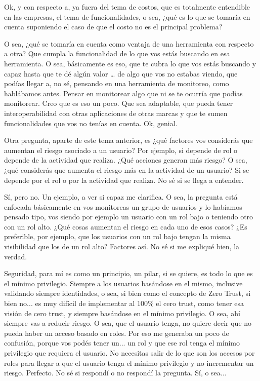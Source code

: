 \begin{description}[leftmargin=0cm, labelsep=0.5cm]
    \item[\textbf{MOCIULSKY SANTIAGO:}] Ok, y con respecto a, ya fuera del tema de costos, que es totalmente entendible en las empresas, el tema de funcionalidades, o sea, ¿qué es lo que se tomaría en cuenta suponiendo el caso de que el costo no es el principal problema?

    \item[\textbf{JACUBOVICH LUCIANA:}] O sea, ¿qué se tomaría en cuenta como ventaja de una herramienta con respecto a otra? Que cumpla la funcionalidad de lo que vos estás buscando en esa herramienta. O sea, básicamente es eso, que te cubra lo que vos estás buscando y capaz hasta que te dé algún valor … de algo que vos no estabas viendo, que podías llegar a, no sé, pensando en una herramienta de monitoreo, como hablábamos antes. Pensar en monitorear algo que ni se te ocurría que podías monitorear. Creo que es eso un poco. Que sea adaptable, que pueda tener interoperabilidad con otras aplicaciones de otras marcas y que te sumen funcionalidades que vos no tenías en cuenta. Ok, genial.

    \item[\textbf{MOCIULSKY SANTIAGO:}] Otra pregunta, aparte de este tema anterior, es ¿qué factores vos considerás que aumentan el riesgo asociado a un usuario? Por ejemplo, si depende de rol o depende de la actividad que realiza. ¿Qué acciones generan más riesgo? O sea, ¿qué considerás que aumenta el riesgo más en la actividad de un usuario? Si se depende por el rol o por la actividad que realiza. No sé si se llega a entender.

    \item[\textbf{MUNTAABSKI FEDERICO:}] Sí, pero no. Un ejemplo, a ver si capaz me clarifica. O sea, la pregunta está enfocada básicamente en vos monitoreas un grupo de usuarios y lo habíamos pensado tipo, vos siendo por ejemplo un usuario con un rol bajo o teniendo otro con un rol alto. ¿Qué cosas aumentan el riesgo en cada uno de esos casos? ¿Es preferible, por ejemplo, que los usuarios con un rol bajo tengan la misma visibilidad que los de un rol alto? Factores así. No sé si me expliqué bien, la verdad.

    \item[\textbf{JACUBOVICH LUCIANA:}] Seguridad, para mí es como un principio, un pilar, si se quiere, es todo lo que es el mínimo privilegio. Siempre a los usuarios basándose en el mismo, inclusive validando siempre identidades, o sea, si bien como el concepto de Zero Trust, si bien no... es muy difícil de implementar al 100\% el cero trust, como tener esa visión de cero trust, y siempre basándose en el mínimo privilegio. O sea, ahí siempre vas a reducir riesgo. O sea, que el usuario tenga, no quiere decir que no pueda haber un acceso basado en roles. Por eso me generaba un poco de confusión, porque vos podés tener un... un rol y que ese rol tenga el mínimo privilegio que requiera el usuario. No necesitas salir de lo que son los accesos por roles para llegar a que el usuario tenga el mínimo privilegio y no incrementar un riesgo. Perfecto. No sé si respondí o no respondí la pregunta. Sí, o sea...


\end{description}
